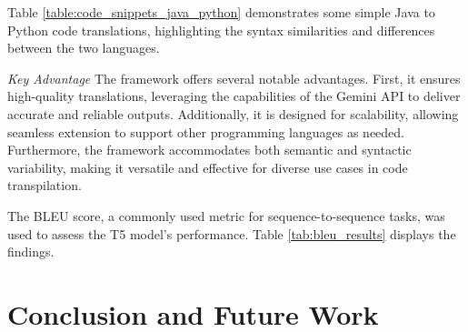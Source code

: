 \documentclass{dhbenelux}
\begin{document}
\begin{table}[h!]
\centering

\caption{Java to Python Code Snippets}
\label{table:code_snippets_java_python}
\end{table}

Table \ref{table:code_snippets_java_python} demonstrates some simple Java to Python code translations, highlighting the syntax similarities and differences between the two languages.

\textit{Key Advantage} 
The framework offers several notable advantages. First, it ensures high-quality translations, leveraging the capabilities of the Gemini API to deliver accurate and reliable outputs. Additionally, it is designed for scalability, allowing seamless extension to support other programming languages as needed. Furthermore, the framework accommodates both semantic and syntactic variability, making it versatile and effective for diverse use cases in code transpilation.


The BLEU score, a commonly used metric for sequence-to-sequence tasks, was used to assess the T5 model's performance. Table \ref{tab:bleu_results} displays the findings.

\section{Conclusion and Future Work}
\end{document}
